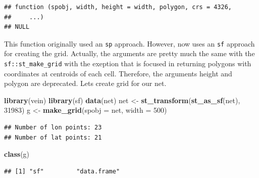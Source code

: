 \documentclass[12pt,graybox,envcountchap,sectrefs]{krantz}
\makeatletter
\newenvironment{Shaded}{\begin{snugshade}}{\end{snugshade}}
\newcommand{\KeywordTok}[1]{\textcolor[rgb]{0.13,0.29,0.53}{\textbf{#1}}}
\newcommand{\DataTypeTok}[1]{\textcolor[rgb]{0.13,0.29,0.53}{#1}}
\newcommand{\DecValTok}[1]{\textcolor[rgb]{0.00,0.00,0.81}{#1}}
\newcommand{\StringTok}[1]{\textcolor[rgb]{0.31,0.60,0.02}{#1}}
\newcommand{\OtherTok}[1]{\textcolor[rgb]{0.56,0.35,0.01}{#1}}
\newcommand{\OperatorTok}[1]{\textcolor[rgb]{0.81,0.36,0.00}{\textbf{#1}}}
\newcommand{\NormalTok}[1]{#1}
\newenvironment{kframe}{%
\medskip{}
\setlength{\fboxsep}{.8em}
 \def\at@end@of@kframe{}%
 \ifinner\ifhmode%
  \def\at@end@of@kframe{\end{minipage}}%
  \begin{minipage}{\columnwidth}%
 \fi\fi%
 \def\FrameCommand##1{\hskip\@totalleftmargin \hskip-\fboxsep
 \colorbox{shadecolor}{##1}\hskip-\fboxsep
     \hskip-\linewidth \hskip-\@totalleftmargin \hskip\columnwidth}%
 \MakeFramed {\advance\hsize-\width
   \@totalleftmargin\z@ \linewidth\hsize
   \@setminipage}}%
 {\par\unskip\endMakeFramed%
 \at@end@of@kframe}
\renewenvironment{Shaded}{\begin{kframe}}{\end{kframe}}
\theoremstyle{definition}
\theoremstyle{definition}
\theoremstyle{definition}
\theoremstyle{remark}
\makeatother
\begin{document}
\begin{verbatim}
## function (spobj, width, height = width, polygon, crs = 4326, 
##     ...) 
## NULL
\end{verbatim}

This function originally used an \texttt{sp} approach. However, now uses
an \texttt{sf} approach for creating the grid. Actually, the arguments
are pretty much the same with the \texttt{sf::st\_make\_grid} with the
exeption that is focused in returning polygons with coordinates at
centroids of each cell. Therefore, the arguments height and polygon are
deprecated. Lets create grid for our net.

\begin{Shaded}
\begin{Highlighting}[]
\KeywordTok{library}\NormalTok{(vein)}
\KeywordTok{library}\NormalTok{(sf)}
\KeywordTok{data}\NormalTok{(net)}
\NormalTok{net <-}\StringTok{ }\KeywordTok{st_transform}\NormalTok{(}\KeywordTok{st_as_sf}\NormalTok{(net), }\DecValTok{31983}\NormalTok{)}
\NormalTok{g <-}\StringTok{ }\KeywordTok{make_grid}\NormalTok{(}\DataTypeTok{spobj =}\NormalTok{ net, }\DataTypeTok{width =} \DecValTok{500}\NormalTok{)}
\end{Highlighting}
\end{Shaded}

\begin{verbatim}
## Number of lon points: 23
## Number of lat points: 21
\end{verbatim}

\begin{Shaded}
\begin{Highlighting}[]
\KeywordTok{class}\NormalTok{(g)}
\end{Highlighting}
\end{Shaded}

\begin{verbatim}
## [1] "sf"         "data.frame"
\end{verbatim}

\begin{Shaded}
\end{Shaded}
\end{document}
